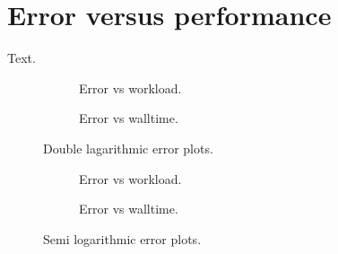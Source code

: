 \section{Error versus performance}
\label{sec:errorvsperformance}

Text.

\begin{figure}
\begin{subfigure}{1\textwidth}
  \centering
  
  \caption{Error vs workload.}
  \label{fig:errorworkload}
\end{subfigure}
\begin{subfigure}{1\textwidth}
  \centering
  
  \caption{Error vs walltime.}
  \label{fig:errorwalltime}
\end{subfigure}
\caption{Double lagarithmic error plots.}
\label{fig:error}
\end{figure}

\begin{figure}
\begin{subfigure}{1\textwidth}
  \centering
  
  \caption{Error vs workload.}
  \label{fig:errorexpworkload}
\end{subfigure}
\begin{subfigure}{1\textwidth}
  \centering
  
  \caption{Error vs walltime.}
  \label{fig:errorexpwalltime}
\end{subfigure}
\caption{Semi logarithmic error plots.}
\label{fig:errorexp}
\end{figure}